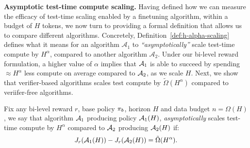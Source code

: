 \textbf{Asymptotic test-time compute scaling.} Having defined how we can measure the efficacy of test-time scaling enabled by a finetuning algorithm, within a budget of $H$ tokens, we now turn to providing a formal definition that allows us to compare different algorithms. Concretely, Definition~\ref{def:h-alpha-scaling} defines what it means for an algorithm $\mathcal{A}_1$ to \emph{``asymptotically''} scale test-time compute by $H^\alpha$, compared to another algorithm $\mathcal{A}_2$. Under our bi-level reward formulation, a higher value of $\alpha$ implies that ${\mathcal{A}}_1$ is able to succeed by spending $\approx H^\alpha$ less compute on average compared to ${\mathcal{A}}_2$, as we scale $H$. Next, we show that verifier-based algorithms scales test compute by $\tilde{\Omega}(H^\alpha)$ compared to veriifer-free algorithms.   
\vspace{-0.1cm}
\begin{tcolorbox}[colback=green!5!white,colframe=black,boxsep=0pt,top=4pt,bottom=4pt,left=3pt,right=3pt]
\begin{definition}
\label{def:h-alpha-scaling}
Fix any bi-level reward $r$, base policy $\pi_b$, horizon $H$ and data budget $n = \Omega(H)$, we say that algorithm  ${\mathcal{A}}_1$ producing policy ${\mathcal{A}}_1(H)$, \emph{asymptotically} scales test-time compute by $H^\alpha$ compared to ${\mathcal{A}}_2$ producing  ${\mathcal{A}}_2(H)$ if:
\begin{align*}
J_r({\mathcal{A}}_1(H)) -  J_r({\mathcal{A}}_2(H)) = \tilde{\Omega}(H^\alpha).
\end{align*}
\end{definition}
\end{tcolorbox}


















